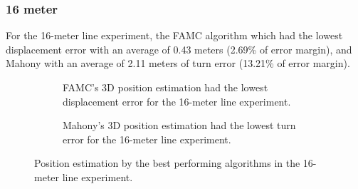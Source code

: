 \newpage

\subsubsection{16 meter}

For the 16-meter line experiment, the FAMC algorithm which had the lowest displacement error with an average of 0.43 meters (2.69\% of error margin), and Mahony with an average of 2.11 meters of turn error (13.21\% of error margin).

\begin{figure}[H]
    \centering
    
\end{figure}

\begin{figure}[H]
    \centering
    \begin{subfigure}{0.49\textwidth}
        \centering
        \resizebox{1\linewidth}{!}{}
        \caption{ FAMC's 3D position estimation had the lowest displacement error for the 16-meter line experiment. }
        \label{fig:line16_2D}
    \end{subfigure}
    \begin{subfigure}{0.49\textwidth}
        \centering
        \resizebox{1\linewidth}{!}{}
        \caption{Mahony's 3D position estimation had the lowest turn error for the 16-meter line experiment.}
        \label{fig:line16_3D}
    \end{subfigure}
    \caption{Position estimation by the best performing algorithms in the 16-meter line experiment.}
    \label{fig:line16}
\end{figure}



%     

